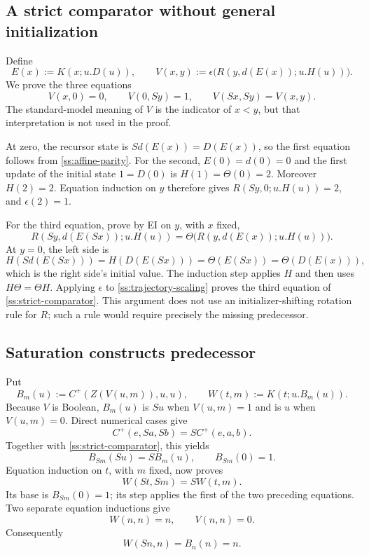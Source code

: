 \documentclass[11pt,letterpaper]{article}
\theoremstyle{definition}\newtheorem{definition}[theorem]{Definition}
\theoremstyle{remark}\newtheorem{remark}[theorem]{Remark}
\begin{document}
\subsection{A strict comparator without general initialization}

Define
\[
 E(x):=K(x;u.D(u)),\qquad
 V(x,y):=\epsilon\bigl(R(y,d(E(x));u.H(u))\bigr).
\]
We prove the three equations
\begin{equation}
 V(x,0)=0,\qquad V(0,Sy)=1,\qquad
 V(Sx,Sy)=V(x,y).
 \label{ss:strict-comparator}
\end{equation}
The standard-model meaning of $V$ is the indicator of $x<y$, but
that interpretation is not used in the proof.

At zero, the recursor state is $Sd(E(x))=D(E(x))$, so the first
equation follows from \eqref{ss:affine-parity}.
For the second, $E(0)=d(0)=0$ and the first update of the initial
state $1=D(0)$ is $H(1)=\Theta(0)=2$.  Moreover $H(2)=2$.
Equation induction on $y$ therefore gives
$R(Sy,0;u.H(u))=2$, and $\epsilon(2)=1$.

For the third equation, prove by EI on $y$, with $x$ fixed,
\begin{equation}
 R(Sy,d(E(Sx));u.H(u))
     =\Theta\bigl(R(y,d(E(x));u.H(u))\bigr).
 \label{ss:trajectory-scaling}
\end{equation}
At $y=0$, the left side is
\[
 H(Sd(E(Sx)))=H(D(E(Sx)))
   =\Theta(E(Sx))=\Theta(D(E(x))),
\]
which is the right side's initial value.  The induction step applies
$H$ and then uses $H\Theta=\Theta H$.
Applying $\epsilon$ to \eqref{ss:trajectory-scaling} proves the third
equation of \eqref{ss:strict-comparator}.
This argument does not use an initializer-shifting rotation rule for
$R$; such a rule would require precisely the missing predecessor.

\subsection{Saturation constructs predecessor}

Put
\[
 B_m(u):=C^+(Z(V(u,m)),u,u),\qquad
 W(t,m):=K(t;u.B_m(u)).
\]
Because $V$ is Boolean, $B_m(u)$ is $Su$ when $V(u,m)=1$ and is
$u$ when $V(u,m)=0$.  Direct numerical cases give
\[
 C^+(e,Sa,Sb)=S C^+(e,a,b).
\]
Together with \eqref{ss:strict-comparator}, this yields
\[
 B_{Sm}(Su)=S B_m(u),\qquad B_{Sm}(0)=1.
\]
Equation induction on $t$, with $m$ fixed, now proves
\begin{equation}
                         W(St,Sm)=S W(t,m).
 \label{ss:saturated-shift}
\end{equation}
Its base is $B_{Sm}(0)=1$; its step applies the first of the two
preceding equations.  Two separate equation inductions give
\[
                       W(n,n)=n,\qquad V(n,n)=0.
\]
Consequently
\begin{equation}
                         W(Sn,n)=B_n(n)=n.
 \label{ss:extra-step}
\end{equation}
\end{document}

